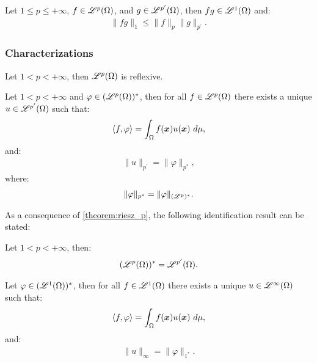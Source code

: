 \begin{theorem}
    Let $1 \leq p \leq +\infty$, $f \in \mathscr{L}^{p}(\Omega)$, and $g \in \mathscr{L}^{p^{\prime}}(\Omega)$, then $fg \in \mathscr{L}^{1}(\Omega)$ and:
    \begin{gather}
        \lVert fg \rVert_1 \leq \lVert f \rVert_p \lVert g \rVert_{p^{\prime}}.
    \end{gather}
\end{theorem}

\subsubsection{Characterizations}

\begin{theorem}
    Let $1 < p < +\infty$, then $\mathscr{L}^{p}(\Omega)$ is reflexive.
\end{theorem}

\begin{theorem} \label{theorem:riesz_p}
    Let $1 < p < +\infty$ and $\varphi \in (\mathscr{L}^{p}(\Omega))^*$, then for all $f \in \mathscr{L}^{p}(\Omega)$ there exists a unique $u \in \mathscr{L}^{p^{\prime}}(\Omega)$ such that:
    \begin{gather}
        \langle f, \varphi \rangle = \int_{\Omega} f(\bm{x}) u(\bm{x}) ~ d \mu,
    \end{gather}
    and:
    \begin{gather}
        \lVert u \rVert_{p^{\prime}} = \lVert \varphi \rVert_{p^*},
    \end{gather}
    where:
    \begin{gather}
        \lVert \varphi \rVert_{p^*} = \lVert \varphi \rVert_{(\mathscr{L}^{p})^*}.
    \end{gather}
\end{theorem}

As a consequence of \autoref{theorem:riesz_p}, the following identification result can be stated:

\begin{theorem}
    Let $1 < p < +\infty$, then:
    \begin{gather}
        (\mathscr{L}^{p}(\Omega))^* = \mathscr{L}^{p^{\prime}}(\Omega).
    \end{gather}
\end{theorem}

\begin{theorem}[Riesz representation theorem for $p = 1$] \label{theorem:riesz_1}
    Let $\varphi \in (\mathscr{L}^{1}(\Omega))^*$, then for all $f \in \mathscr{L}^{1}(\Omega)$ there exists a unique $u \in \mathscr{L}^{\infty}(\Omega)$ such that:
    \begin{gather}
        \langle f, \varphi \rangle = \int_{\Omega} f(\bm{x}) u(\bm{x}) ~ d \mu,
    \end{gather}
    and:
    \begin{gather}
        \lVert u \rVert_{\infty} = \lVert \varphi \rVert_{1^*}.
    \end{gather}
\end{theorem}

